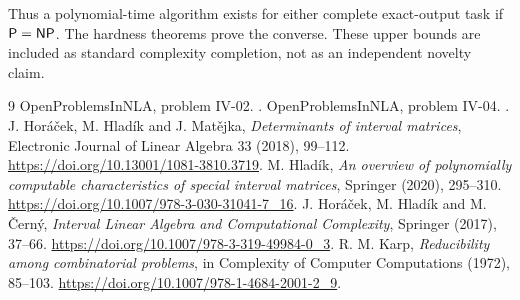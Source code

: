 Thus a polynomial-time algorithm exists for either complete exact-output task if $\mathsf P=\mathsf{NP}$. The hardness theorems prove the converse. These upper bounds are included as standard complexity completion, not as an independent novelty claim.
\begin{thebibliography}{9}
 OpenProblemsInNLA, problem IV-02. .
 OpenProblemsInNLA, problem IV-04. .
 J. Hor\'a\v cek, M. Hlad\'ik and J. Mat\v ejka, \emph{Determinants of interval matrices}, Electronic Journal of Linear Algebra 33 (2018), 99--112. \url{https://doi.org/10.13001/1081-3810.3719}.
 M. Hlad\'ik, \emph{An overview of polynomially computable characteristics of special interval matrices}, Springer (2020), 295--310. \url{https://doi.org/10.1007/978-3-030-31041-7_16}.
 J. Hor\'a\v cek, M. Hlad\'ik and M. \v Cern\'y, \emph{Interval Linear Algebra and Computational Complexity}, Springer (2017), 37--66. \url{https://doi.org/10.1007/978-3-319-49984-0_3}.
 R. M. Karp, \emph{Reducibility among combinatorial problems}, in Complexity of Computer Computations (1972), 85--103. \url{https://doi.org/10.1007/978-1-4684-2001-2_9}.
\end{thebibliography}

